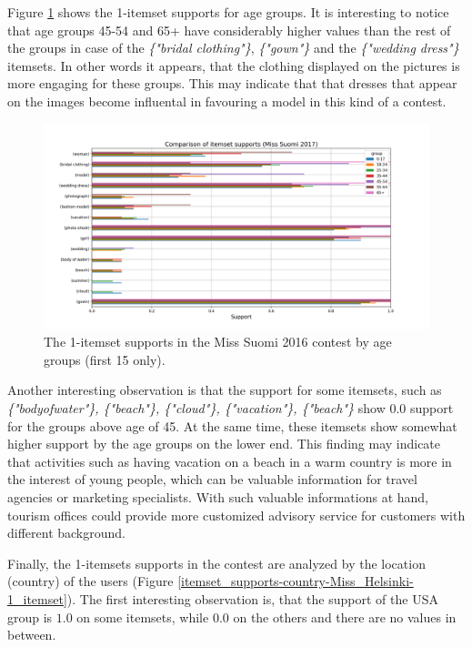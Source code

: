 Figure \ref{itemset_supports-age_group-Miss_Helsinki-1_itemset} shows the 1-itemset supports for age groups. It is interesting to notice that age groups 45-54 and 65+ have considerably higher values than the rest of the groups in case of the \textit{\{"bridal clothing"\}}, \textit{\{"gown"\}} and the \textit{\{"wedding dress"\}} itemsets. In other words it appears, that the clothing displayed on the pictures is more engaging for these groups. This may indicate that that dresses that appear on the images become influental in favouring a model in this kind of a contest. 

\begin{figure}[h] 
    \begin{center}
        \includegraphics[width=1.0\textwidth]{Images/itemset_supports-age_group-Miss_Helsinki-1_itemset.png}
        \caption{The 1-itemset supports in the Miss Suomi 2016 contest by age groups (first 15 only).}
        \label{itemset_supports-age_group-Miss_Helsinki-1_itemset}
    \end{center}
\end{figure}

Another interesting observation is that the support for some itemsets, such as \textit{\{"body\:of\:water"\}, \{"beach"\}, \{"cloud"\}, \{"vacation"\}, \{"beach"\}} show 0.0 support for the groups above age of 45. At the same time, these itemsets show somewhat higher support by the age groups on the lower end. This finding may indicate that activities such as having vacation on a beach in a warm country is more in the interest of young people, which can be valuable information for travel agencies or marketing specialists. With such valuable informations at hand, tourism offices could provide more customized advisory service for customers with different background. 

Finally, the 1-itemsets supports in the contest are analyzed by the location (country) of the users (Figure \ref{itemset_supports-country-Miss_Helsinki-1_itemset}). The first interesting observation is, that the support of the USA group is $1.0$ on some itemsets, while 0.0 on the others and there are no values in between.

